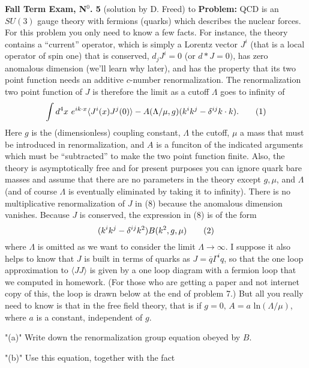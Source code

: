 
\nologo

\noindent
{\bf Fall Term Exam, N$^{\text{0}}$. 5}\qquad\qquad\qquad
\qquad\qquad\qquad\qquad\qquad(solution by D. Freed)
\smallskip
\hbox to \hsize {\hrulefill}
\bigskip
\noindent
{\bf Problem:}
\medskip
QCD is an $SU(3)$ gauge theory with fermions (quarks) which
describes the nuclear forces.  For this problem you only
need to know a few facts.  For instance, the theory
contains a ``current'' operator, which is simply a Lorentz
vector $J^i$ (that is a local operator of spin one) that is
conserved, $d_jJ^i=0$ (or $d*J=0)$, has zero anomalous
dimension (we'll learn why later), and has the property
that its two point function needs an additive $c$-number
renormalization.
\medskip
The renormalization two point function of $J$ is therefore
the limit as a cutoff $\Lambda$ goes to infinity of
$$
\int d^4x\,\,e^{ik\cdot x}\langle
J^i(x)J^j(0)\rangle-A(\Lambda\slash\mu,g)(k^ik^j-\delta^{ij}
k\cdot k).\tag1
$$
Here $g$ is the (dimensionless) coupling constant,
$\Lambda$ the cutoff, $\mu$ a mass that must be introduced
in renormalization, and $A$ is a funciton of the indicated
arguments which must be ``subtracted'' to make the two
point function finite.  Also, the theory is asymptotically
free and for present purposes you can ignore quark bare
masses and assume that there are no parameters in the
theory except $g,\mu$, and $\Lambda$ (and of course
$\Lambda$ is eventually eliminated by taking it to
infinity).  There is no multiplicative renormalization of
$J$ in (8) because the anomalous dimension vanishes.
Because $J$ is conserved, the expression in (8) is of the
form
$$
(k^ik^j-\delta^{ij}k^2)B(k^2,g,\mu)\tag2
$$
where $\Lambda$ is omitted as we want to consider the limit
$\Lambda\rightarrow\infty$.
\medskip
I suppose it also helps to know that $J$ is built in terms
of quarks as $J=\overline q\Gamma^iq$, so that the one
loop approximation to $\langle JJ\rangle$ is given by a one
loop diagram with a fermion loop that we computed in
homework.  (For those who are getting a paper and not
internet copy of this, the loop is drawn below at the end
of problem 7.)  But all you really need to know is that in
the free field theory, that is if $g=0,\,A=a$
ln$(\Lambda\slash\mu)$, where $a$ is a constant,
independent of $g$.
\roster
\item"{(a)}"  Write down the renormalization group equation
obeyed by $B$.
\smallskip
\item"{(b)}"  Use this equation, together with the fact
